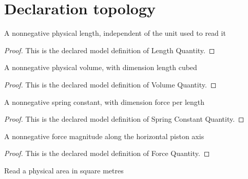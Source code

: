 \section{Declaration topology}
\begin{definition}
  \label{def:physics:phyx-mini-0375:phyxminiproblems-problemphyxmini0375-lengthquantity}
  A nonnegative physical length, independent of the unit used to read it
\end{definition}
\begin{proof}
  This is the declared model definition of Length Quantity.
\end{proof}
\begin{definition}
  \label{def:physics:phyx-mini-0375:phyxminiproblems-problemphyxmini0375-volumequantity}
  A nonnegative physical volume, with dimension length cubed
\end{definition}
\begin{proof}
  This is the declared model definition of Volume Quantity.
\end{proof}
\begin{definition}
  \label{def:physics:phyx-mini-0375:phyxminiproblems-problemphyxmini0375-springconstantquantity}
  A nonnegative spring constant, with dimension force per length
\end{definition}
\begin{proof}
  This is the declared model definition of Spring Constant Quantity.
\end{proof}
\begin{definition}
  \label{def:physics:phyx-mini-0375:phyxminiproblems-problemphyxmini0375-forcequantity}
  A nonnegative force magnitude along the horizontal piston axis
\end{definition}
\begin{proof}
  This is the declared model definition of Force Quantity.
\end{proof}
\begin{definition}
  \label{def:physics:phyx-mini-0375:phyxminiproblems-problemphyxmini0375-areainsquaremeters}
  Read a physical area in square metres
\end{definition}
